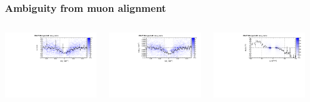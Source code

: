 \documentclass[compress]{beamer}
\begin{document}
\begin{frame}
\frametitle{Ambiguity from muon alignment}

\begin{columns}

\includegraphics[width=\linewidth]{residuals_realshift.pdf}

\includegraphics[width=\linewidth]{curvature_realshift.pdf}

\includegraphics[width=\linewidth]{momenta_realshift.pdf}


\end{columns}
\end{frame}
\end{document}
